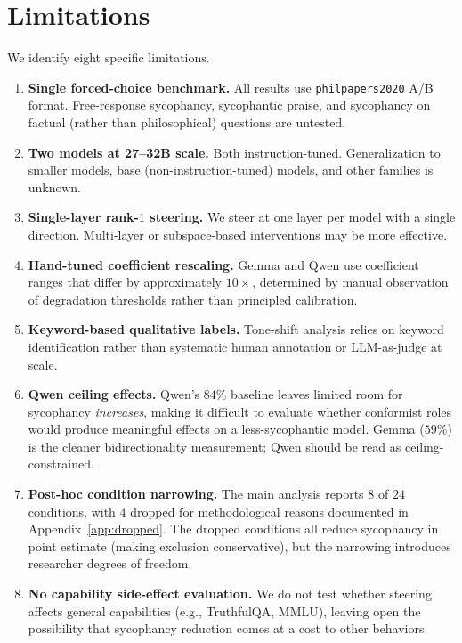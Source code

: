 \documentclass{article}
\theoremstyle{plain}
\theoremstyle{definition}
\theoremstyle{remark}
\begin{document}
\section{Limitations}\label{app:limits}

We identify eight specific limitations.

\begin{enumerate}
\item \textbf{Single forced-choice benchmark.} All results use \texttt{philpapers2020} A/B format. Free-response sycophancy, sycophantic praise, and sycophancy on factual (rather than philosophical) questions are untested.
\item \textbf{Two models at 27--32B scale.} Both instruction-tuned. Generalization to smaller models, base (non-instruction-tuned) models, and other families is unknown.
\item \textbf{Single-layer rank-$1$ steering.} We steer at one layer per model with a single direction. Multi-layer or subspace-based interventions may be more effective.
\item \textbf{Hand-tuned coefficient rescaling.} Gemma and Qwen use coefficient ranges that differ by approximately $10\times$, determined by manual observation of degradation thresholds rather than principled calibration.
\item \textbf{Keyword-based qualitative labels.} Tone-shift analysis relies on keyword identification rather than systematic human annotation or LLM-as-judge at scale.
\item \textbf{Qwen ceiling effects.} Qwen's $84\%$ baseline leaves limited room for sycophancy \emph{increases}, making it difficult to evaluate whether conformist roles would produce meaningful effects on a less-sycophantic model. Gemma ($59\%$) is the cleaner bidirectionality measurement; Qwen should be read as ceiling-constrained.
\item \textbf{Post-hoc condition narrowing.} The main analysis reports $8$ of $24$ conditions, with $4$ dropped for methodological reasons documented in Appendix~\ref{app:dropped}. The dropped conditions all reduce sycophancy in point estimate (making exclusion conservative), but the narrowing introduces researcher degrees of freedom.
\item \textbf{No capability side-effect evaluation.} We do not test whether steering affects general capabilities (e.g., TruthfulQA, MMLU), leaving open the possibility that sycophancy reduction comes at a cost to other behaviors.
\end{enumerate}
\end{document}
